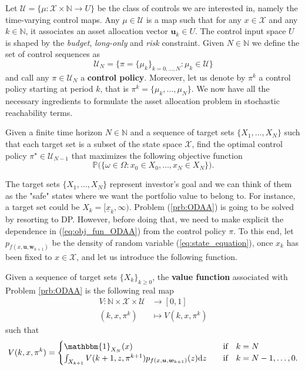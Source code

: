 Let $\mathcal{U} = \big\{ \mu : \mathcal{X} \times \mathbb{N} \rightarrow U \big\}$ be the class of controls we are interested in, namely the time-varying control maps. Any $\mu \in \mathcal{U}$ is a map such that for any $x \in \mathcal{X}$ and any $k \in \mathbb{N}$, it associates an asset allocation vector $\bm{u}_k \in U$. The control input space $U$ is shaped by the \textit{budget}, \textit{long-only} and \textit{risk} constraint. Given $N \in \mathbb{N}$ we define the set of control sequences as \[\mathcal{U}_N = \Big\{\pi = \{\mu_k\}_{k=0,\ldots,N}  : \mu_k \in \mathcal{U} \Big\}\] and call any $\pi \in \mathcal{U}_N$ a \textbf{control policy}. Moreover, let us denote by $\pi^k$ a control policy starting at period $k$, that is $\pi^k=\{\mu_k,\ldots,\mu_N\}$. We now have all the necessary ingredients to formulate the asset allocation problem in stochastic reachability terms.
\begin{problem}\label{prb:ODAA}
Given a finite time horizon $N \in \mathbb{N}$ and a sequence of target sets $\{X_1,\ldots,X_N \} $ such that each target set is a subset of the state space $\mathcal{X}$, find the optimal control policy $\pi^{\star} \in \mathcal{U}_{N-1}$ that maximizes the following objective function 
\begin{equation}\label{eq:obj_fun_ODAA}
\mathbb{P}\Big(\big\{\omega \in \Omega : x_0 \in X_0,\ldots,x_N \in X_N \big\} \Big).
\end{equation}
\end{problem}
The target sets $\{X_1,\ldots,X_N \}$ represent investor's goal and we can think of them as the "safe" states where we want the portfolio value to belong to. For instance, a target set could be $X_k = [\underline{x}_k,\infty)$. Problem (\ref{prb:ODAA}) is going to be solved by resorting to \gls{DP}. However, before doing that, we need to make explicit the dependence in (\ref{eq:obj_fun_ODAA}) from the control policy $\pi$. To this end, let $p_{f(x,\bm{u},\bm{w}_{k+1})}$ be the density of random variable (\ref{eq:state_equation}), once $x_k$ has been fixed to $x \in \mathcal{X}$, and let us introduce the following function.
\begin{definition}
	Given a sequence of target sets $\{X_k\}_{k\geq0}$, the \textbf{value function} associated with Problem \ref{prb:ODAA} is the following real map
	\begin{align*}
	V \colon \mathbb{N}\times \mathcal{X}\times \mathcal{U} & \rightarrow [0,1]\\
	(k,x,\pi^k) & \mapsto V(k,x,\pi^k)
	\end{align*}
	such that 
	\[V(k,x,\pi^k)=
	\begin{cases}
	    \mathbbm{1}_{X_N}(x) & \quad \text{if} \quad k = N \\
	    \int_{X_{k+1}}V(k+1,z,\pi^{k+1})p_{f(x,\bm{u},\bm{w}_{k+1})}(z)\mathrm{d}z & \quad \text{if} \quad k = N-1,\ldots,0.
	\end{cases}
	\]
	\end{definition}
